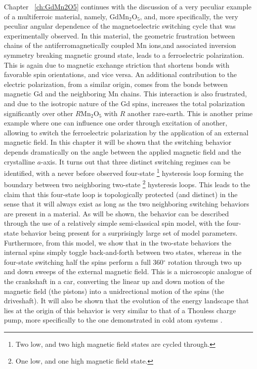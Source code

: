 Chapter ~\ref{ch:GdMn2O5} continues with the discussion of a very peculiar example of a multiferroic material, namely, GdMn$_2$O$_5$, and, more specifically, the very peculiar angular dependence of the magnetoelectric switching cycle that was experimentally observed.
In this material, the geometric frustration between chains of the antiferromagnetically coupled Mn ions,and associated inversion symmetry breaking magnetic ground state, leads to a ferroelectric polarization. This is again due to magnetic exchange striction that shortens bonds with favorable spin orientations, and vice versa.
An additional contribution to the electric polarization, from a similar origin, comes from the bonds between magnetic Gd and the neighboring Mn chains. This interaction is also frustrated, and due to the isotropic nature of the Gd spins, increases the total polarization significantly over other $R$Mn$_2$O$_5$ with $R$ another rare-earth.
This is another prime example where one can influence one order through excitation of another, allowing to switch the ferroelectric polarization by the application of an external magnetic field.
In this chapter it will be shown that the switching behavior depends dramatically on the angle between the applied magnetic field and the crystalline $a$-axis.
It turns out that three distinct switching regimes can be identified, with a never before observed four-state \footnote{Two low, and two high magnetic field states are cycled through.} hysteresis loop forming the boundary between two neighboring two-state \footnote{One low, and one high magnetic field state.} hysteresis loops. 
This leads to the claim that this four-state loop is topologically protected (and distinct) in the sense that it will always exist as long as the two neighboring switching behaviors are present in a material.
As will be shown, the behavior can be described through the use of a relatively simple semi-classical spin model, with the four-state behavior being present for a surprisingly large set of model parameters.
Furthermore, from this model, we show that in the two-state behaviors the internal spins simply toggle back-and-forth between two states, whereas in the four-state switching half the spins perform a full 360$^\circ$ rotation through two up and down sweeps of the external magnetic field.
This is a microscopic analogue of the crankshaft in a car, converting the linear up and down motion of the magnetic field (the pistons) into a unidrectional motion of the spins (the driveshaft).
It will also be shown that the evolution of the energy landscape that lies at the origin of this behavior is very similar to that of a Thouless charge pump, more specifically to the one demonstrated in cold atom systems \cite{Lohse16}. 

